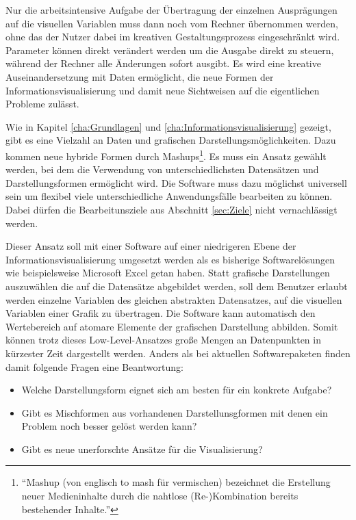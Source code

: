 \documentclass[a4paper, 12pt, DIV=calc, version=first, pdftex, headsepline, footsepline, bibtotocnumbered, liststotocnumbered]{scrreprt}
\begin{document}
Nur die arbeitsintensive Aufgabe der Übertragung der einzelnen Ausprägungen auf die visuellen Variablen muss
dann noch vom Rechner übernommen werden, ohne das der Nutzer dabei im kreativen Gestaltungsprozess eingeschränkt
wird. Parameter können direkt verändert werden um die Ausgabe direkt zu steuern, während der
Rechner alle Änderungen sofort ausgibt. Es wird eine kreative Auseinandersetzung
mit Daten ermöglicht, die neue Formen der Informationsvisualisierung und damit neue Sichtweisen auf
die eigentlichen Probleme zulässt.

Wie in Kapitel \ref{cha:Grundlagen} und \ref{cha:Informationsvisualisierung} gezeigt, gibt es eine Vielzahl an
Daten und grafischen Darstellungsmöglichkeiten. Dazu kommen neue hybride Formen durch Mashups\footnote{"`Mashup (von
englisch to mash für vermischen) bezeichnet die Erstellung neuer Medieninhalte durch die nahtlose
(Re-)Kombination bereits bestehender Inhalte."'\citep{wiki_mashup}}. Es muss ein Ansatz gewählt
werden, bei dem die Verwendung von unterschiedlichsten Datensätzen und Darstellungsformen ermöglicht wird.
Die Software muss dazu möglichst universell sein um flexibel viele unterschiedliche Anwendungsfälle
bearbeiten zu können. Dabei dürfen die Bearbeitunsziele aus Abschnitt \ref{sec:Ziele} nicht
vernachlässigt werden.

Dieser Ansatz soll mit einer Software auf einer niedrigeren Ebene der Informationsvisualisierung umgesetzt werden als
es bisherige Softwarelösungen wie beispielsweise Microsoft Excel getan haben. Statt grafische Darstellungen auszuwählen
die auf die Datensätze abgebildet werden, soll dem Benutzer erlaubt werden einzelne Variablen des gleichen abstrakten Datensatzes,
auf die visuellen Variablen einer Grafik zu übertragen. Die Software kann automatisch den Wertebereich auf atomare Elemente der
grafischen Darstellung abbilden. Somit können trotz dieses Low-Level-Ansatzes große Mengen an Datenpunkten
in kürzester Zeit dargestellt werden. Anders als bei aktuellen Softwarepaketen finden damit folgende Fragen
eine Beantwortung:
\begin{itemize}
\item Welche Darstellungsform eignet sich am besten für ein konkrete Aufgabe?
\item Gibt es Mischformen aus vorhandenen Darstellunsgformen mit denen ein Problem noch besser gelöst werden kann?
\item Gibt es neue unerforschte Ansätze für die Visualisierung?
\end{itemize}
\end{document}
